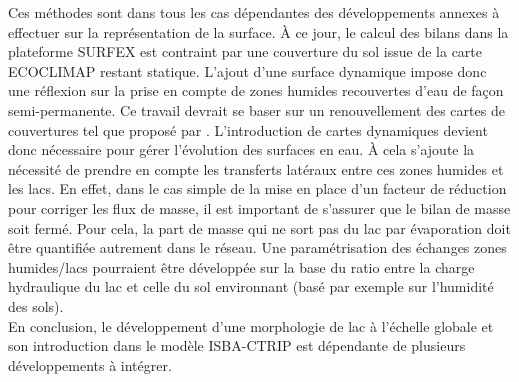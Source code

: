 Ces méthodes sont dans tous les cas dépendantes des développements annexes à effectuer sur la représentation de la surface. À ce jour, le calcul des bilans dans la plateforme SURFEX est contraint par une couverture du sol issue de la carte ECOCLIMAP restant statique. L'ajout d'une surface dynamique impose donc une réflexion sur la prise en compte de zones humides recouvertes d'eau de façon semi-permanente. Ce travail devrait se baser sur un renouvellement des cartes de couvertures tel que proposé par \citet{pekel2016}. L'introduction de cartes dynamiques devient donc nécessaire pour gérer l'évolution des surfaces en eau. À cela s'ajoute la nécessité de prendre en compte les transferts latéraux entre ces zones humides et les lacs. En effet, dans le cas simple de la mise en place d'un facteur de réduction pour corriger les flux de masse, il est important de s'assurer que le bilan de masse soit fermé. Pour cela, la part de masse qui ne sort pas du lac par évaporation doit être quantifiée autrement dans le réseau. Une paramétrisation des échanges zones humides/lacs pourraient être développée sur la base du ratio entre la charge hydraulique du lac et celle du sol environnant (basé par exemple sur l'humidité des sols).\\
En conclusion, le développement d'une morphologie de lac à l'échelle globale et son introduction dans le modèle ISBA-CTRIP est dépendante de plusieurs développements à intégrer.